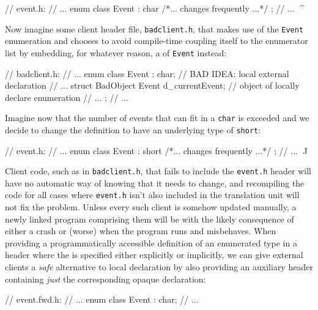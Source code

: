 \begin{emcppslisting}
// event.h:
// ...
enum class Event : char { /*... changes frequently ...*/ };
// ...             ^^^^
\end{emcppslisting}

\noindent Now imagine some client header file, \lstinline!badclient.h!, that makes
use of the \lstinline!Event! enumeration and chooses to avoid compile-time
coupling itself to the enumerator list by
embedding, for whatever reason, a  of \lstinline!Event! instead:

\begin{emcppslisting}
// badclient.h:
// ...
enum class Event : char;  // BAD IDEA: local external declaration
// ...
struct BadObject
{
    Event d_currentEvent;  // object of locally declare enumeration
    // ...
};
// ...
\end{emcppslisting}

\noindent Imagine now that the number of events that can fit in a \lstinline!char! is
exceeded and we decide to change the definition to have an underlying
type of \lstinline!short!:

\begin{emcppslisting}
// event.h:
// ...
enum class Event : short { /*... changes frequently ...*/ };
// ...             ^^^^^
\end{emcppslisting}

\noindent Client code, such as in \lstinline!badclient.h!, that fails to include the
\lstinline!event.h! header will have no automatic way of knowing that it
needs to change, and recompiling the code for all cases where
\lstinline!event.h! isn't also included in the translation unit will not
fix the problem. Unless every such client is somehow updated manually, a
newly linked program comprising them will be \romeogloss{IFNDR} with the likely
consequence of either a crash or (worse) when the program runs and
misbehaves. When providing a programmatically accessible definition of
an enumerated type in a header where the \romeogloss{underlying type} is
specified either explicitly or implicitly, we can give external
clients a \emph{safe} alternative to local declaration by also providing
an auxiliary header containing \emph{just} the corresponding opaque
declaration:

\begin{emcppslisting}[emcppsbatch=e7]
// event.fwd.h:
// ...
enum class Event : char;
// ...
\end{emcppslisting}

